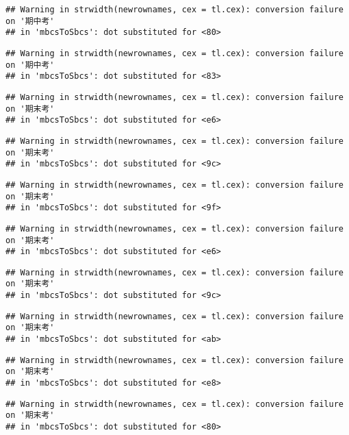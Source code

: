 \documentclass[
]{book}
\begin{document}
\begin{verbatim}
## Warning in strwidth(newrownames, cex = tl.cex): conversion failure on '期中考'
## in 'mbcsToSbcs': dot substituted for <80>
\end{verbatim}

\begin{verbatim}
## Warning in strwidth(newrownames, cex = tl.cex): conversion failure on '期中考'
## in 'mbcsToSbcs': dot substituted for <83>
\end{verbatim}

\begin{verbatim}
## Warning in strwidth(newrownames, cex = tl.cex): conversion failure on '期末考'
## in 'mbcsToSbcs': dot substituted for <e6>
\end{verbatim}

\begin{verbatim}
## Warning in strwidth(newrownames, cex = tl.cex): conversion failure on '期末考'
## in 'mbcsToSbcs': dot substituted for <9c>
\end{verbatim}

\begin{verbatim}
## Warning in strwidth(newrownames, cex = tl.cex): conversion failure on '期末考'
## in 'mbcsToSbcs': dot substituted for <9f>
\end{verbatim}

\begin{verbatim}
## Warning in strwidth(newrownames, cex = tl.cex): conversion failure on '期末考'
## in 'mbcsToSbcs': dot substituted for <e6>
\end{verbatim}

\begin{verbatim}
## Warning in strwidth(newrownames, cex = tl.cex): conversion failure on '期末考'
## in 'mbcsToSbcs': dot substituted for <9c>
\end{verbatim}

\begin{verbatim}
## Warning in strwidth(newrownames, cex = tl.cex): conversion failure on '期末考'
## in 'mbcsToSbcs': dot substituted for <ab>
\end{verbatim}

\begin{verbatim}
## Warning in strwidth(newrownames, cex = tl.cex): conversion failure on '期末考'
## in 'mbcsToSbcs': dot substituted for <e8>
\end{verbatim}

\begin{verbatim}
## Warning in strwidth(newrownames, cex = tl.cex): conversion failure on '期末考'
## in 'mbcsToSbcs': dot substituted for <80>
\end{verbatim}
\end{document}
